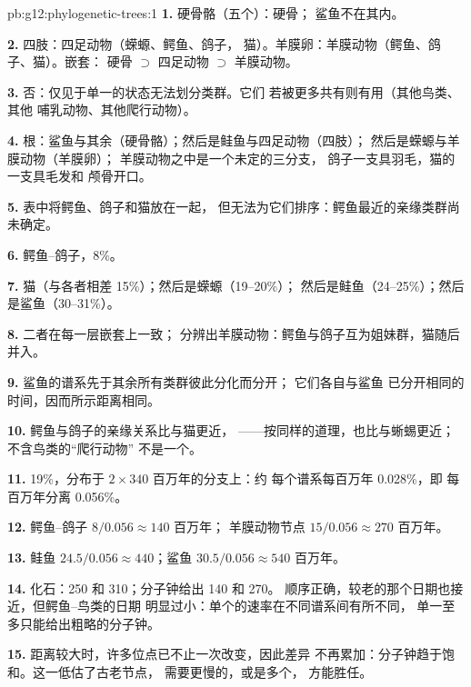 \begin{solution}{pb:g12:phylogenetic-trees:1}
\textbf{1.} 硬骨骼（五个）：硬骨；
鲨鱼不在其内。

\textbf{2.} 四肢：四足动物（蝾螈、鳄鱼、鸽子，
猫）。羊膜卵：羊膜动物（鳄鱼、鸽子、猫）。嵌套：
硬骨 $\supset$ 四足动物 $\supset$ 羊膜动物。

\textbf{3.} 否：仅见于单一的状态无法划分类群。它们
若被更多共有则有用（其他鸟类、其他
哺乳动物、其他爬行动物）。

\textbf{4.} 根：鲨鱼与其余（硬骨骼）；然后是鲑鱼与四足动物（四肢）；
然后是蝾螈与羊膜动物（羊膜卵）；
羊膜动物之中是一个未定的三分支，
鸽子一支具羽毛，猫的一支具毛发和
颅骨开口。

\textbf{5.} 表中将鳄鱼、鸽子和猫放在一起，
但无法为它们排序：鳄鱼最近的亲缘类群尚未确定。

\textbf{6.} 鳄鱼–鸽子，8\%。

\textbf{7.} 猫（与各者相差 15\%）；然后是蝾螈（19--20\%）；
然后是鲑鱼（24--25\%）；然后是鲨鱼（30--31\%）。

\textbf{8.} 二者在每一层嵌套上一致；
分辨出羊膜动物：鳄鱼与鸽子互为姐妹群，猫随后并入。

\textbf{9.} 鲨鱼的谱系先于其余所有类群彼此分化而分开；
它们各自与鲨鱼
已分开相同的时间，因而所示距离相同。

\textbf{10.} 鳄鱼与鸽子的亲缘关系比与猫更近，
——按同样的道理，也比与蜥蜴更近；不含鸟类的“爬行动物”
不是一个。

\textbf{11.} 19\%，分布于 $2 \times 340$ 百万年的分支上：约
每个谱系每百万年 0.028\%，即
每百万年分离 0.056\%。

\textbf{12.} 鳄鱼–鸽子 $8/0.056 \approx 140$ 百万年；
羊膜动物节点 $15/0.056 \approx 270$ 百万年。

\textbf{13.} 鲑鱼 $24.5/0.056 \approx 440$；鲨鱼 $30.5/0.056
\approx 540$ 百万年。

\textbf{14.} 化石：250 和 310；分子钟给出 140 和 270。
顺序正确，较老的那个日期也接近，但鳄鱼–鸟类的日期
明显过小：单个的速率在不同谱系间有所不同，
单一至多只能给出粗略的分子钟。

\textbf{15.} 距离较大时，许多位点已不止一次改变，因此差异
不再累加：分子钟趋于饱和。这一低估了古老节点，
需要更慢的，或是多个，
方能胜任。


\end{solution}
